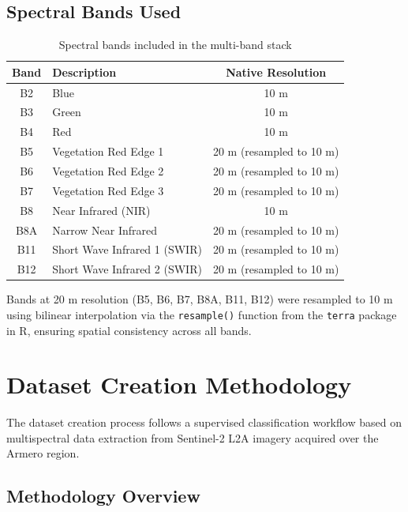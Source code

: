 \documentclass[12pt,a4paper]{article}
\begin{document}
\subsection{Spectral Bands Used}

\begin{table}[H]
\centering
\begin{tabular}{|c|m{6cm}|c|}
\hline
\textbf{Band} & \textbf{Description} & \textbf{Native Resolution} \\
\hline
B2 & Blue & 10 m \\
\hline
B3 & Green & 10 m \\
\hline
B4 & Red & 10 m \\
\hline
B5 & Vegetation Red Edge 1 & 20 m (resampled to 10 m) \\
\hline
B6 & Vegetation Red Edge 2 & 20 m (resampled to 10 m) \\
\hline
B7 & Vegetation Red Edge 3 & 20 m (resampled to 10 m) \\
\hline
B8 & Near Infrared (NIR) & 10 m \\
\hline
B8A & Narrow Near Infrared & 20 m (resampled to 10 m) \\
\hline
B11 & Short Wave Infrared 1 (SWIR) & 20 m (resampled to 10 m) \\
\hline
B12 & Short Wave Infrared 2 (SWIR) & 20 m (resampled to 10 m) \\
\hline
\end{tabular}
\caption{Spectral bands included in the multi-band stack}
\end{table}

Bands at 20 m resolution (B5, B6, B7, B8A, B11, B12) were resampled to 10 m using bilinear interpolation via the \texttt{resample()} function from the \texttt{terra} package in R, ensuring spatial consistency across all bands.

\section{Dataset Creation Methodology}

The dataset creation process follows a supervised classification workflow based on multispectral data extraction from Sentinel-2 L2A imagery acquired over the Armero region.

\subsection{Methodology Overview}
\end{document}
